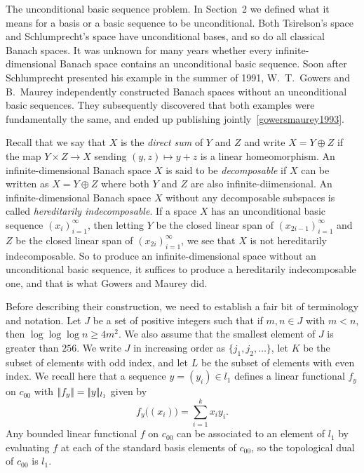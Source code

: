 \medbreak
\boldlabel The unconditional basic sequence problem.
In Section~2 we defined what it means for a basis or a basic sequence to be unconditional.
Both Tsirelson's space and Schlumprecht's space have unconditional bases, and so do all classical Banach spaces.
It was unknown for many years whether every infinite-dimensional Banach space contains an unconditional basic
sequence. Soon after Schlumprecht presented his example in the summer of 1991,
W.~T.~Gowers and B.~Maurey independently constructed
Banach spaces without an unconditional basic sequences. They subsequently discovered that both examples
were fundamentally the same, and ended up publishing jointly~\ref{gowersmaurey1993}.

Recall that we say that $X$ is the {\it direct sum} of $Y$ and $Z$ and write $X = Y\oplus Z$ if
the map $Y\times Z\to X$ sending $(y,z)\mapsto y+z$ is a linear homeomorphism. An infinite-dimensional
Banach space $X$ is said to be {\it decomposable} if $X$ can be written as $X = Y\oplus Z$ where
both $Y$ and $Z$ are also infinite-diimensional. An infinite-dimensional
Banach space $X$ without any decomposable subspaces is called
{\it hereditarily indecomposable}. If a space $X$ has an unconditional basic sequence $(x_i)_{i=1}^\infty$, then
letting $Y$ be the closed linear span of $(x_{2i-1})_{i=1}^\infty$ and $Z$ be the closed linear span
of $(x_{2i})_{i=1}^\infty$, we see that $X$ is not hereditarily indecomposable. So to produce an
infinite-dimensional space without an unconditional basic sequence, it suffices to produce a hereditarily
indecomposable one, and that is what Gowers and Maurey did.

Before describing their construction, we need to establish a fair bit of terminology and notation.
Let $J$ be
a set of positive integers such that if $m,n\in J$ with $m<n$, then $\log\log\log n \ge 4m^2$. We also
assume that the smallest element of $J$ is greater than $256$. We write
$J$ in increasing order as $\{j_1, j_2,\ldots\}$, let $K$ be the subset of elements with odd index, and let $L$
be the subset of elements with even index. We recall here that a sequence $y=(y_i)\in l_1$
defines a linear functional $f_y$ on $c_{00}$ with $|\!|f_y|\!| = |\!|y|\!|_{l_1}$ given by
$$f_y\bigl((x_i)\bigr) = \sum_{i=1}^k x_i y_i.$$
Any bounded linear functional $f$ on $c_{00}$ can be associated to an element of $l_1$ by evaluating $f$
at each of the standard basis elements of $c_{00}$, so the topological dual of $c_{00}$ is $l_1$.

